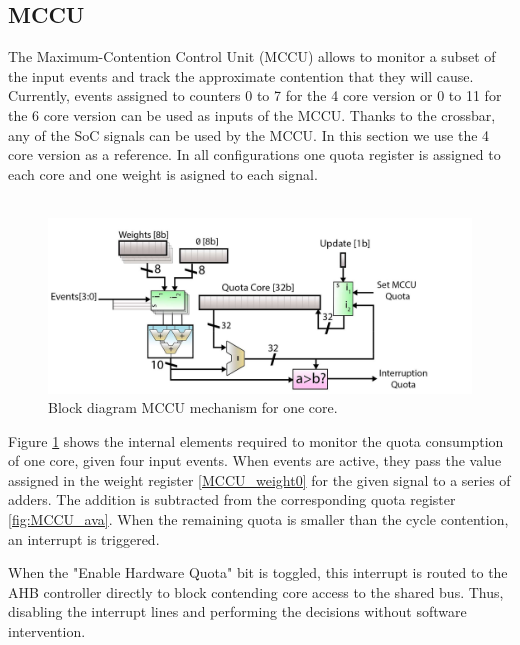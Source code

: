 \subsection{MCCU}
The Maximum-Contention Control Unit (MCCU) allows to monitor a subset of the input events and track the approximate contention that they will cause. Currently, events assigned to counters 0 to 7 for the 4 core version or 0 to 11 for the 6 core version can be used as inputs of the MCCU.  Thanks to the crossbar, any of the SoC signals can be used by the MCCU. In this section we use the 4 core version as a reference. In all configurations one quota register is assigned to each core and one weight is asigned to each signal.\\
\\
\begin{figure}[H]
	\includegraphics[keepaspectratio,width=\columnwidth]{img/bd_MCCU.png}
	\caption{Block diagram MCCU mechanism for one core.}
	\label{fig:blk_MCCU}
\end{figure}
Figure \ref{fig:blk_MCCU} shows the internal elements required to monitor the quota consumption of one core, given four input events.  When events are active, they pass the value assigned in the weight register \ref{MCCU_weight0} for the given signal to a series of adders. The addition is subtracted from the corresponding quota register \ref{fig:MCCU_ava}. When the remaining quota is smaller than the cycle contention, an interrupt is triggered.

When the "Enable Hardware Quota" bit is toggled, this interrupt is routed to the AHB controller directly to block contending core access to the shared bus. Thus, disabling the interrupt lines and performing the decisions without software intervention.



